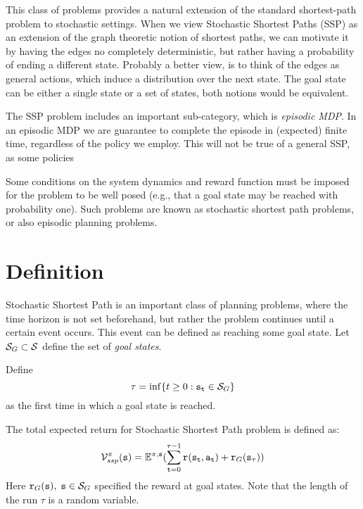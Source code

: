 




This class of problems provides a natural extension of the standard shortest-path problem to stochastic settings. When we view Stochastic Shortest Paths (SSP) as an extension of the graph theoretic notion of shortest paths, we can motivate it by having the edges no completely deterministic, but rather having a probability of ending a different state.
%
Probably a better view, is to think of the edges as general actions, which induce a distribution over the next state.
%
The goal state can be either a single state or a set of states, both notions would be equivalent. 

The SSP problem includes an important sub-category, which is {\em episodic MDP}. In an episodic MDP we are guarantee to complete the episode in (expected) finite time, regardless of the policy we employ. This will not be true of a general SSP, as some policies 


Some conditions on the system dynamics and reward function must be imposed for the problem to be well posed (e.g., that a goal state may be reached  with probability one).
Such problems are known as stochastic shortest path problems, or also episodic planning problems. 

\section{Definition}

Stochastic Shortest Path is an important class of planning problems, 
where the time horizon is not
set beforehand, but rather the problem continues until a certain
event occurs. This event can be defined as reaching some goal state.
Let  ${\mathcal{S}_G} \subset \mathcal{S}$ define the set of \emph{goal
states}. 

Define
\[\tau  = \inf \{ t \ge 0:{{\tt s}_{\tt t}} \in {\mathcal{S}_G}\} \]
as the first time in which a goal state is reached. 

The total expected return for Stochastic Shortest Path problem is defined as:
\[\mathcal{V}_{ssp}^\pi ({\tt s}) = {\mathbb{E}^{\pi ,{\tt s}}}(\sum\limits_{{\tt t} = 0}^{\tau  - 1} {{\tt r}({{\tt s}_{\tt t}},{{\tt a}_{\tt t}})}  + {{\tt r}_G}({{\tt s}_\tau }))\]
Here ${{\tt r}_G}({\tt s}),\;{\tt s} \in {\mathcal{S}_G}$ specified the
reward at goal states. Note that the length of the run $\tau$ is a random variable.

